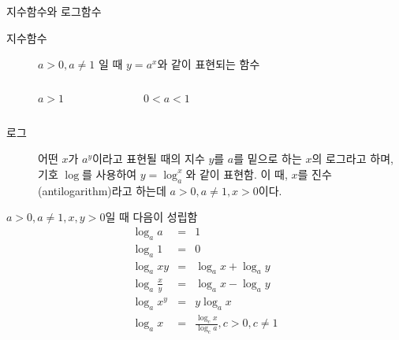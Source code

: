 \documentclass[10pt,t]{beamer}
\begin{document}
\begin{frame}{지수함수와 로그함수}
\begin{description}
    \item[지수함수] $a>0, a\neq 1$ 일 때 $y = a^x$와 같이 표현되는 함수 
\end{description}
\begin{columns}
    \begin{figure}
        \caption{$a>1$}
    \end{figure}
    \begin{figure}
        \caption{$0<a<1$}
    \end{figure}
    
\end{columns}

\pagebreak

\begin{description}
    \item[로그] 어떤 $x$가 $a^y$이라고 표현될 때의 지수 $y$를 $a$를 밑으로 하는 $x$의 로그라고 하며, 기호 $\log$를 사용하여 $y=\log_a^x$와 같이 표현함. 이 때, $x$를 진수(antilogarithm)라고 하는데 $a>0, a\neq1, x>0$이다.
\end{description}

$a>0, a\neq1, x, y >0$일 때 다음이 성립함
\begin{eqnarray*}
    \log_a a &= & 1 \\
    \log_a 1 &= & 0 \\
    \log_a xy &= & \log_a x + \log_a y \\
    \log_a \frac{x}{y} &= & \log_a x - \log_a y\\
    \log_a x^y &= & y\log_a x\\
    \log_a x &= & \frac{\log_c x}{ \log_c a} , c>0, c \neq 1 
\end{eqnarray*} 


\end{frame}
\end{document}
